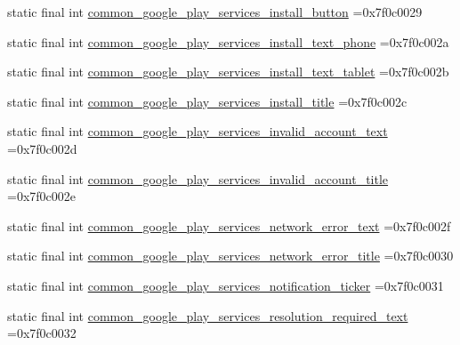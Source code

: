 \begin{DoxyCompactItemize}
static final int \mbox{\hyperlink{classbr_1_1unb_1_1cic_1_1mp_1_1marketmaster_1_1R_1_1string_a8aae4eb102a0c59ed91f0c05a2b009c1}{common\+\_\+google\+\_\+play\+\_\+services\+\_\+install\+\_\+button}} =0x7f0c0029
\item 
static final int \mbox{\hyperlink{classbr_1_1unb_1_1cic_1_1mp_1_1marketmaster_1_1R_1_1string_ad81ea85fe34af015fd4f9022dc911b2d}{common\+\_\+google\+\_\+play\+\_\+services\+\_\+install\+\_\+text\+\_\+phone}} =0x7f0c002a
\item 
static final int \mbox{\hyperlink{classbr_1_1unb_1_1cic_1_1mp_1_1marketmaster_1_1R_1_1string_a95eeb4355106e4df1608a5ef244c9968}{common\+\_\+google\+\_\+play\+\_\+services\+\_\+install\+\_\+text\+\_\+tablet}} =0x7f0c002b
\item 
static final int \mbox{\hyperlink{classbr_1_1unb_1_1cic_1_1mp_1_1marketmaster_1_1R_1_1string_aece2edad5d00c49294d1525fa85cf985}{common\+\_\+google\+\_\+play\+\_\+services\+\_\+install\+\_\+title}} =0x7f0c002c
\item 
static final int \mbox{\hyperlink{classbr_1_1unb_1_1cic_1_1mp_1_1marketmaster_1_1R_1_1string_aaa1c38563ea33597db40d1cf8ca7df10}{common\+\_\+google\+\_\+play\+\_\+services\+\_\+invalid\+\_\+account\+\_\+text}} =0x7f0c002d
\item 
static final int \mbox{\hyperlink{classbr_1_1unb_1_1cic_1_1mp_1_1marketmaster_1_1R_1_1string_a08499c5857094c62397b0143b800ded4}{common\+\_\+google\+\_\+play\+\_\+services\+\_\+invalid\+\_\+account\+\_\+title}} =0x7f0c002e
\item 
static final int \mbox{\hyperlink{classbr_1_1unb_1_1cic_1_1mp_1_1marketmaster_1_1R_1_1string_aec52d6fb3367808437c324182b1a88a0}{common\+\_\+google\+\_\+play\+\_\+services\+\_\+network\+\_\+error\+\_\+text}} =0x7f0c002f
\item 
static final int \mbox{\hyperlink{classbr_1_1unb_1_1cic_1_1mp_1_1marketmaster_1_1R_1_1string_aece6ee90c9c583cde07eca2d24fe8b75}{common\+\_\+google\+\_\+play\+\_\+services\+\_\+network\+\_\+error\+\_\+title}} =0x7f0c0030
\item 
static final int \mbox{\hyperlink{classbr_1_1unb_1_1cic_1_1mp_1_1marketmaster_1_1R_1_1string_af8c3485d6b4d21617873ed0cd4536f45}{common\+\_\+google\+\_\+play\+\_\+services\+\_\+notification\+\_\+ticker}} =0x7f0c0031
\item 
static final int \mbox{\hyperlink{classbr_1_1unb_1_1cic_1_1mp_1_1marketmaster_1_1R_1_1string_ac7fa12b6b54ce30a5642ca2e8dab6732}{common\+\_\+google\+\_\+play\+\_\+services\+\_\+resolution\+\_\+required\+\_\+text}} =0x7f0c0032

\end{DoxyCompactItemize}

